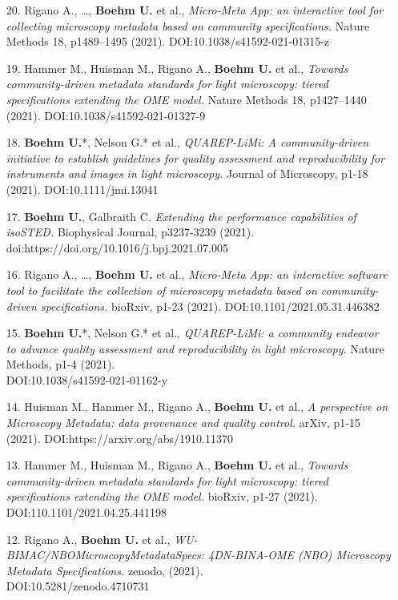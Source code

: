 \documentclass[margin,line]{res}
\begin{document}
\begin{resume}
\begin{enumerate}[leftmargin=*]
\item[20.] Rigano A., \dots, {\bf Boehm U.} et al., {\it Micro-Meta App: an interactive tool for collecting microscopy metadata based on community specifications.} Nature Methods 18, p1489–1495 (2021). DOI:10.1038/s41592-021-01315-z

\item[19.] Hammer M., Huisman M., Rigano A., {\bf Boehm U.} et al., {\it Towards community-driven metadata standards for light microscopy: tiered specifications extending the OME model.} Nature Methods 18, p1427–1440 (2021). DOI:10.1038/s41592-021-01327-9

\item[18.] {\bf Boehm U.}*, Nelson G.* et al., {\it QUAREP-LiMi: A community-driven initiative to establish guidelines for quality assessment and reproducibility for instruments and images in light microscopy.} Journal of Microscopy, p1-18 (2021). DOI:10.1111/jmi.13041

\item[17.] {\bf Boehm U.}, Galbraith C. {\it Extending the performance capabilities of isoSTED.} Biophysical Journal, p3237-3239 (2021). doi:https://doi.org/10.1016/j.bpj.2021.07.005

\item[16.] Rigano A., \dots, {\bf Boehm U.} et al., {\it Micro-Meta App: an interactive software tool to facilitate the collection of microscopy metadata based on community-driven specifications.} bioRxiv, p1-23 (2021). DOI:10.1101/2021.05.31.446382

\item[15.] {\bf Boehm U.}*, Nelson G.* et al., {\it QUAREP-LiMi: a community endeavor to advance quality assessment and reproducibility in light microscopy.} Nature Methods, p1-4 (2021). \\DOI:10.1038/s41592-021-01162-y

\item[14.] Huisman M., Hammer M., Rigano A., {\bf Boehm U.} et al., {\it A perspective on Microscopy Metadata: data provenance and quality control.} arXiv, p1-15 (2021). DOI:https://arxiv.org/abs/1910.11370

\item[13.] Hammer M., Huisman M., Rigano A., {\bf Boehm U.} et al., {\it Towards community-driven metadata standards for light microscopy: tiered specifications extending the OME model.} bioRxiv, p1-27 (2021). DOI:110.1101/2021.04.25.441198

\item[12.] Rigano A., {\bf Boehm U.} et al., {\it WU-BIMAC/NBOMicroscopyMetadataSpecs: 4DN-BINA-OME (NBO) Microscopy Metadata Specifications.} zenodo, (2021). \\DOI:10.5281/zenodo.4710731


\end{enumerate}
\end{resume}
\end{document}
